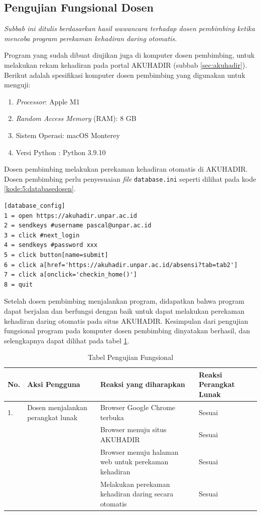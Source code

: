 \subsection{Pengujian Fungsional Dosen}

\textit{Subbab ini ditulis berdasarkan hasil wawancara terhadap dosen pembimbing ketika mencoba program perekaman kehadiran daring otomatis.}

Program yang sudah dibuat diujikan juga di komputer dosen pembimbing, untuk melakukan rekam kehadiran pada portal AKUHADIR (subbab \ref{sec:akuhadir}). Berikut adalah spesifikasi komputer dosen pembimbing yang digunakan untuk menguji:

\begin{enumerate}
	\item \textit{Processor}: Apple M1
	\item \textit{Random Access Memory} (RAM): 8 GB
	\item Sistem Operasi: macOS Monterey
	\item Versi Python : Python 3.9.10
\end{enumerate}

Dosen pembimbing melakukan perekaman kehadiran otomatis di AKUHADIR. Dosen pembimbing perlu penyesuaian \textit{file} \texttt{database.ini} seperti dilihat pada kode \ref{kode:5:databasedosen}.

\begin{lstlisting}[caption=\textit{File} \texttt{database.ini} AKUHADIR (\textit{password} disembunyikan), label=kode:5:databasedosen]
[database_config]
1 = open https://akuhadir.unpar.ac.id
2 = sendkeys #username pascal@unpar.ac.id
3 = click #next_login
4 = sendkeys #password xxx
5 = click button[name=submit]
6 = click a[href='https://akuhadir.unpar.ac.id/absensi?tab=tab2']
7 = click a[onclick='checkin_home()']
8 = quit
\end{lstlisting}


Setelah dosen pembimbing menjalankan program, didapatkan bahwa program dapat berjalan dan berfungsi dengan baik untuk dapat melakukan perekaman kehadiran daring otomatis pada situs AKUHADIR. Kesimpulan dari pengujian fungsional program pada komputer dosen pembimbing dinyatakan berhasil, dan selengkapnya dapat dilihat pada tabel \ref{tab:fungsidosen}.
\newpage
\begin{table}[H] 		
	\caption{Tabel Pengujian Fungsional}
	\centering
	\begin{tabular}{|p{0.5cm} |p{4cm} |p{5.5cm}| p{3cm}|} \hline
		No. & Aksi Pengguna & Reaksi yang diharapkan & Reaksi Perangkat Lunak\\ \hline     
		1. & Dosen menjalankan perangkat lunak & Browser Google Chrome terbuka & Sesuai\\ \hline 
		 	& &  Browser menuju situs AKUHADIR & Sesuai\\ \hline
		 	& &  Browser menuju halaman web untuk perekaman kehadiran & Sesuai\\ \hline
		 	& &  Melakukan perekaman kehadiran daring secara otomatis & Sesuai\\ \hline
	\end{tabular}
	\label{tab:fungsidosen}
\end{table}


